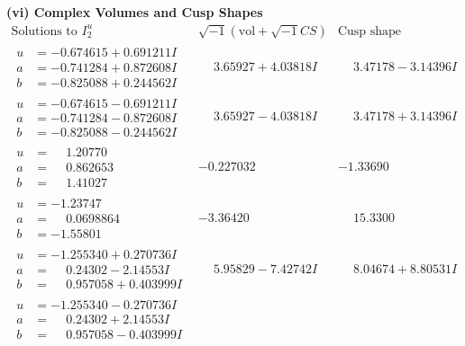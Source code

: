 \documentclass[1p]{elsarticle_modified}
\theoremstyle{definition}
\newcommand{\I}{\sqrt{-1}}
\begin{document}
\newpage\flushleft \textbf{(vi) Complex Volumes and Cusp Shapes}
$$\begin{array}{c|c|c}  
\text{Solutions to }I^u_{2}& \I (\text{vol} + \sqrt{-1}CS) & \text{Cusp shape}\\
 \hline 
\begin{aligned}
u &= -0.674615 + 0.691211 I \\
a &= -0.741284 + 0.872608 I \\
b &= -0.825088 + 0.244562 I\end{aligned}
 & \phantom{-}3.65927 + 4.03818 I & \phantom{-}3.47178 - 3.14396 I \\ \hline\begin{aligned}
u &= -0.674615 - 0.691211 I \\
a &= -0.741284 - 0.872608 I \\
b &= -0.825088 - 0.244562 I\end{aligned}
 & \phantom{-}3.65927 - 4.03818 I & \phantom{-}3.47178 + 3.14396 I \\ \hline\begin{aligned}
u &= \phantom{-}1.20770\phantom{ +0.000000I} \\
a &= \phantom{-}0.862653\phantom{ +0.000000I} \\
b &= \phantom{-}1.41027\phantom{ +0.000000I}\end{aligned}
 & -0.227032\phantom{ +0.000000I} & -1.33690\phantom{ +0.000000I} \\ \hline\begin{aligned}
u &= -1.23747\phantom{ +0.000000I} \\
a &= \phantom{-}0.0698864\phantom{ +0.000000I} \\
b &= -1.55801\phantom{ +0.000000I}\end{aligned}
 & -3.36420\phantom{ +0.000000I} & \phantom{-}15.3300\phantom{ +0.000000I} \\ \hline\begin{aligned}
u &= -1.255340 + 0.270736 I \\
a &= \phantom{-}0.24302 - 2.14553 I \\
b &= \phantom{-}0.957058 + 0.403999 I\end{aligned}
 & \phantom{-}5.95829 - 7.42742 I & \phantom{-}8.04674 + 8.80531 I \\ \hline\begin{aligned}
u &= -1.255340 - 0.270736 I \\
a &= \phantom{-}0.24302 + 2.14553 I \\
b &= \phantom{-}0.957058 - 0.403999 I\end{aligned}

\end{array}$$
\end{document}
